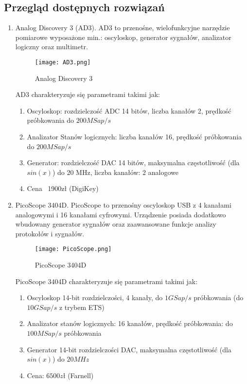 \subsection{Przegląd dostępnych rozwiązań}
    \begin{enumerate}
        \item Analog Discovery 3 (AD3).
        \newline AD3 to przenośne, wielofunkcyjne narzędzie pomiarowe wyposażone min.:
        oscyloskop, generator sygnałów, analizator logiczny oraz multimetr.
        \begin{figure}[H]
        \centering
        \texttt{[image: AD3.png]}
        \caption{Analog Discovery 3}
        \label{fig:AD3}
    \end{figure}

    AD3 charakteryzuje się parametrami takimi jak:
    \begin{enumerate}[label=\arabic*.]
        \item Oscyloskop: rozdzielczość ADC 14 bitów, liczba kanałów 2, prędkość próbkowania do $200 MSap/s$
        \item Analizator Stanów logicznych: liczba kanałów 16, prędkość próbkowania do $200 MSap/s$
        \item Generator: rozdzielczość DAC 14 bitów, maksymalna częstotliwość (dla $sin(x)$) do 20 MHz, 
        liczba kanałów: 2 analogowe
        \item Cena ~1900zł (DigiKey)
    \end{enumerate}

    \item PicoScope 3404D. 
    \newline PicoScope to przenośny oscyloskop USB z 4 kanałami analogowymi i
    16 kanałami cyfrowymi. Urządzenie posiada dodatkowo wbudowany generator
    sygnałów oraz zaawansowane funkcje analizy protokołów i sygnałów.
        \begin{figure}[H]
        \centering
        \texttt{[image: PicoScope.png]}
        \caption{PicoScope 3404D}
        \label{fig:PicoScope}
    \end{figure}

    PicoScope 3404D charakteryzuje się parametrami takimi jak:
    \begin{enumerate}[label=\arabic*.]
        \item Oscyloskop 14-bit rozdzielczości, 4 kanały, do $1 GSap/s$ próbkowania (do $10 GSap/s$ z trybem ETS)
        \item Analizator stanów logicznych: 16 kanałów, prędkość próbkowania: do $100 MSap/s$ próbkowania
        \item Generator 14-bit rozdzielczości DAC, maksymalna częstotliwość (dla $sin(x)$) do $20 MHz$ 
        \item Cena: $6500 zł$ (Farnell)
    \end{enumerate}

    \end{enumerate}




